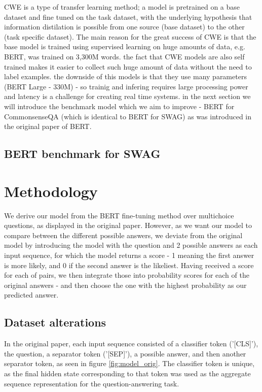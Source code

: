 \documentclass{article}
\begin{document}
CWE is a type of transfer learning method; a model is pretrained on a base dataset and fine tuned on the task dataset,  with the underlying hypothesis that information distilation is possible from one source (base dataset) to the other (task specific dataset).
The main reason for the great success of CWE is that the base model is trained using supervised learning on huge amounts of data, e.g. BERT, was trained on 3,300M words. the fact that CWE models are also self trained makes it easier to collect such huge amount of data without the need to label examples. the downside of this models is that they use many parameters (BERT Large - 330M) - so trainig and infering requires large processing power and latency is a challenge for creating real time systems. in the next section we will introduce the benchmark model which we aim to improve - BERT for CommonsenseQA (which is identical to BERT for SWAG) as was introduced in the original paper of BERT.

\subsection{BERT benchmark for SWAG}

\section{Methodology}

We derive our model from the BERT fine-tuning method over multichoice questions, as displayed in the original paper. However, as we want our model to compare between the different possible answers, we deviate from the original model by introducing the model with the question and 2 possible answers as each input sequence, for which the model returns a score - 1 meaning the first answer is more likely, and 0 if the second answer is the likeliest. Having received a score for each of pairs, we then integrate those into probability scores for each of the original answers - and then choose the one with the highest probability as our predicted answer.

\subsection{Dataset alterations}

In the original paper, each input sequence consisted of a classifier token ('[CLS]'), the question, a separator token ('[SEP]'), a possible answer, and then another separator token, as seen in figure \ref{fig:model_orig}. The classifier token is unique, as the final hidden state corresponding to that token was used as the aggregate sequence representation for the question-answering task.
\end{document}
